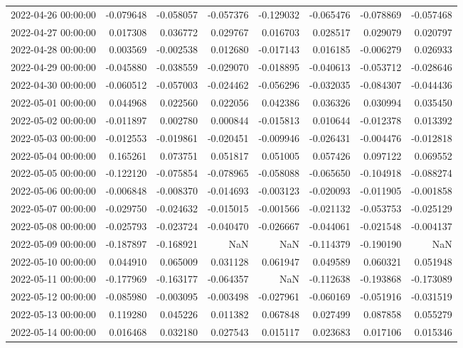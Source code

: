 \begin{tabular}{lrrrrrrr}
2022-04-26 00:00:00 & -0.079648 & -0.058057 & -0.057376 & -0.129032 & -0.065476 & -0.078869 & -0.057468 \\
2022-04-27 00:00:00 & 0.017308 & 0.036772 & 0.029767 & 0.016703 & 0.028517 & 0.029079 & 0.020797 \\
2022-04-28 00:00:00 & 0.003569 & -0.002538 & 0.012680 & -0.017143 & 0.016185 & -0.006279 & 0.026933 \\
2022-04-29 00:00:00 & -0.045880 & -0.038559 & -0.029070 & -0.018895 & -0.040613 & -0.053712 & -0.028646 \\
2022-04-30 00:00:00 & -0.060512 & -0.057003 & -0.024462 & -0.056296 & -0.032035 & -0.084307 & -0.044436 \\
2022-05-01 00:00:00 & 0.044968 & 0.022560 & 0.022056 & 0.042386 & 0.036326 & 0.030994 & 0.035450 \\
2022-05-02 00:00:00 & -0.011897 & 0.002780 & 0.000844 & -0.015813 & 0.010644 & -0.012378 & 0.013392 \\
2022-05-03 00:00:00 & -0.012553 & -0.019861 & -0.020451 & -0.009946 & -0.026431 & -0.004476 & -0.012818 \\
2022-05-04 00:00:00 & 0.165261 & 0.073751 & 0.051817 & 0.051005 & 0.057426 & 0.097122 & 0.069552 \\
2022-05-05 00:00:00 & -0.122120 & -0.075854 & -0.078965 & -0.058088 & -0.065650 & -0.104918 & -0.088274 \\
2022-05-06 00:00:00 & -0.006848 & -0.008370 & -0.014693 & -0.003123 & -0.020093 & -0.011905 & -0.001858 \\
2022-05-07 00:00:00 & -0.029750 & -0.024632 & -0.015015 & -0.001566 & -0.021132 & -0.053753 & -0.025129 \\
2022-05-08 00:00:00 & -0.025793 & -0.023724 & -0.040470 & -0.026667 & -0.044061 & -0.021548 & -0.004137 \\
2022-05-09 00:00:00 & -0.187897 & -0.168921 & NaN & NaN & -0.114379 & -0.190190 & NaN \\
2022-05-10 00:00:00 & 0.044910 & 0.065009 & 0.031128 & 0.061947 & 0.049589 & 0.060321 & 0.051948 \\
2022-05-11 00:00:00 & -0.177969 & -0.163177 & -0.064357 & NaN & -0.112638 & -0.193868 & -0.173089 \\
2022-05-12 00:00:00 & -0.085980 & -0.003095 & -0.003498 & -0.027961 & -0.060169 & -0.051916 & -0.031519 \\
2022-05-13 00:00:00 & 0.119280 & 0.045226 & 0.011382 & 0.067848 & 0.027499 & 0.087858 & 0.055279 \\
2022-05-14 00:00:00 & 0.016468 & 0.032180 & 0.027543 & 0.015117 & 0.023683 & 0.017106 & 0.015346 \\

\end{tabular}
